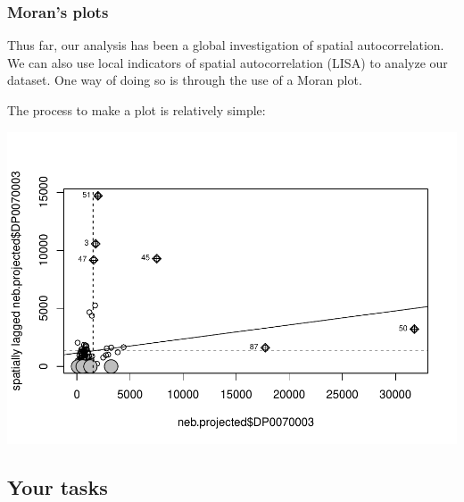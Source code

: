 \documentclass[]{article}
\newenvironment{Shaded}{\begin{snugshade}}{\end{snugshade}}
\newcommand{\AttributeTok}[1]{\textcolor[rgb]{0.77,0.63,0.00}{#1}}
\newcommand{\CommentTok}[1]{\textcolor[rgb]{0.56,0.35,0.01}{\textit{#1}}}
\newcommand{\ConstantTok}[1]{\textcolor[rgb]{0.00,0.00,0.00}{#1}}
\newcommand{\FunctionTok}[1]{\textcolor[rgb]{0.00,0.00,0.00}{#1}}
\newcommand{\NormalTok}[1]{#1}
\newcommand{\SpecialCharTok}[1]{\textcolor[rgb]{0.00,0.00,0.00}{#1}}
\begin{document}
\hypertarget{morans-plots}{%
\subsubsection{Moran's plots}\label{morans-plots}}

Thus far, our analysis has been a global investigation of spatial
autocorrelation. We can also use local indicators of spatial
autocorrelation (LISA) to analyze our dataset. One way of doing so is
through the use of a Moran plot.

The process to make a plot is relatively simple:

\begin{Shaded}
\end{Shaded}

\includegraphics{lab03_files/figure-latex/moranplot-1.pdf}

\hypertarget{your-tasks}{%
\subsection{Your tasks}\label{your-tasks}}
\end{document}
